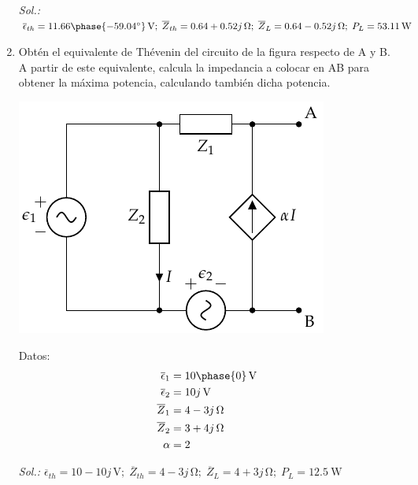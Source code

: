 \begin{enumerate}
\emph{Sol.:\;
  $ \overline{\epsilon}_{th} = 11.66\phase{\ang{-59.04}}\,\si{\volt};\;
  \overline{Z}_{th} = 0.64 + 0.52j\,\si{\ohm};\; \overline{Z}_L = 0.64-0.52j\,\si{\ohm};\; P_L = \qty{53.11}{\watt}$}

\item Obtén el equivalente de Thévenin del circuito de la figura respecto de A y B. A partir de este equivalente, calcula la impedancia a colocar en AB para obtener la máxima potencia, calculando también dicha potencia.

\begin{minipage}{0.5\textwidth}
\begin{center}
\includegraphics{../figs/Thevenin5}
\end{center}
\end{minipage}
\begin{minipage}{0.5\textwidth}
\hspace{20mm}Datos:
  \begin{align*}
    \overline{\epsilon}_1 &= \SI[parse-numbers=false]{10\phase{0}}{\volt}\\
    \overline{\epsilon}_2 &= \SI[parse-numbers=false]{10j}{\volt}\\
    \overline{Z}_1 &= \SI[parse-numbers=false]{4 - 3j}{\ohm}\\
    \overline{Z}_2 &= \SI[parse-numbers=false]{3 + 4j}{\ohm}\\
    \alpha &= 2
  \end{align*}
\end{minipage}

\vspace{2mm}
\emph{Sol.:\; $
  \overline{\epsilon}_{th} =  10 - 10j \,\si{\volt};\;
  \overline{Z}_{th} = 4 - 3j \,\si{\ohm};\; \overline{Z}_L = 4 + 3j\,\si{\ohm};\; P_L = \qty{12.5}{\watt}
  $}


\end{enumerate}

